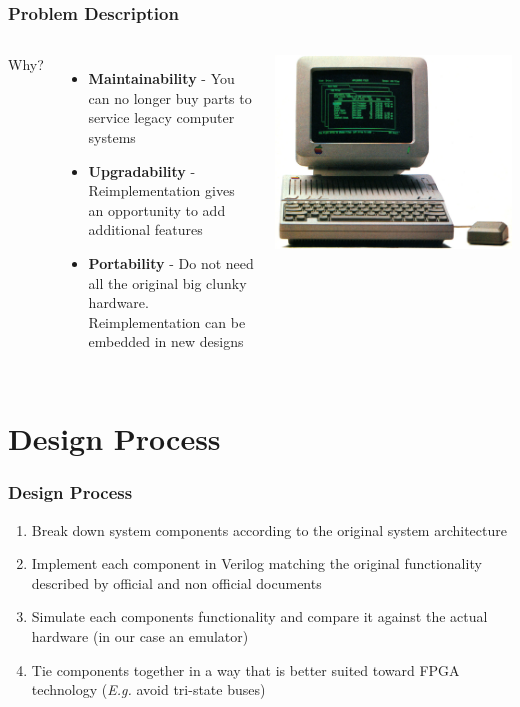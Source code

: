 \documentclass[xcolor=table]{beamer}
\newlength{\wideitemsep}
\let\olditem\item
\renewcommand{\item}{\setlength{\itemsep}{\wideitemsep}\olditem}
\begin{document}
\begin{frame}
    \frametitle{Problem Description}

    \begin{columns}[c]
            Why?
            \begin{itemize}
                \item<2-> \textbf{Maintainability} - You can no longer buy parts to service legacy computer systems
                \item<3-> \textbf{Upgradability} - Reimplementation gives an opportunity to add additional features
                \item<4-> \textbf{Portability} - Do not need all the original big clunky hardware. Reimplementation can
                    be embedded in new designs
            \end{itemize}

            \includegraphics[width=\textwidth]{../images/apple_2.jpg}
    \end{columns}
\end{frame}

\section{Design Process}
\begin{frame}
    \frametitle{Design Process}
    \begin{enumerate}
        \item<1-> Break down system components according to the original system architecture
        \item<2-> Implement each component in Verilog matching the original
            functionality described by official and non official documents
        \item<3-> Simulate each components functionality and compare it against the actual hardware (in our case an emulator)
        \item<4-> Tie components together in a way that is better suited toward FPGA technology (\emph{E.g.} avoid tri-state buses)
    \end{enumerate}
\end{frame}
\end{document}
